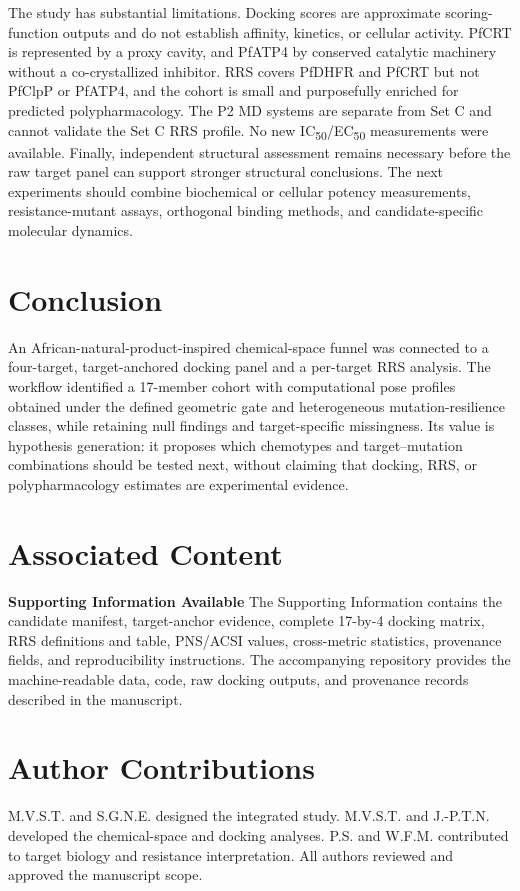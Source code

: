 \documentclass[journal=jcisd8,manuscript=article]{achemso}
\begin{document}
The study has substantial limitations. Docking scores are approximate scoring-function outputs and do not establish affinity, kinetics, or cellular activity. PfCRT is represented by a proxy cavity, and PfATP4 by conserved catalytic machinery without a co-crystallized inhibitor. RRS covers PfDHFR and PfCRT but not PfClpP or PfATP4, and the cohort is small and purposefully enriched for predicted polypharmacology. The P2 MD systems are separate from Set C and cannot validate the Set C RRS profile. No new IC\textsubscript{50}/EC\textsubscript{50} measurements were available. Finally, independent structural assessment remains necessary before the raw target panel can support stronger structural conclusions. The next experiments should combine biochemical or cellular potency measurements, resistance-mutant assays, orthogonal binding methods, and candidate-specific molecular dynamics.

\section{Conclusion}
An African-natural-product-inspired chemical-space funnel was connected to a four-target, target-anchored docking panel and a per-target RRS analysis. The workflow identified a 17-member cohort with computational pose profiles obtained under the defined geometric gate and heterogeneous mutation-resilience classes, while retaining null findings and target-specific missingness. Its value is hypothesis generation: it proposes which chemotypes and target--mutation combinations should be tested next, without claiming that docking, RRS, or polypharmacology estimates are experimental evidence.

\section*{Associated Content}
\textbf{Supporting Information Available}
The Supporting Information contains the candidate manifest, target-anchor evidence, complete 17-by-4 docking matrix, RRS definitions and table, PNS/ACSI values, cross-metric statistics, provenance fields, and reproducibility instructions. The accompanying repository provides the machine-readable data, code, raw docking outputs, and provenance records described in the manuscript.

\section*{Author Contributions}
M.V.S.T. and S.G.N.E. designed the integrated study. M.V.S.T. and J.-P.T.N. developed the chemical-space and docking analyses. P.S. and W.F.M. contributed to target biology and resistance interpretation. All authors reviewed and approved the manuscript scope.
\end{document}

